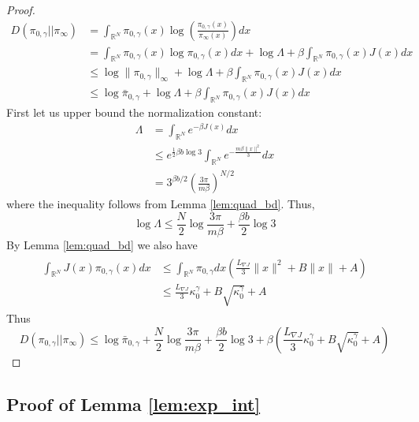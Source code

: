 \documentclass[journal,onecolumn]{IEEEtran}
\newcommand{\grad}{\nabla}
\newcommand{\rew}{J}
\newcommand{\reals}{\mathbb{R}}
\newcommand{\dimn}{N}
\newcommand{\kn}{\kappa_0}
\newcommand{\knw}{\kn^{\idw}}
\newcommand{\KL}{D}
\newcommand{\gibbs}{\ids_{\infty}}
\newcommand{\ids}{\pi}
\newcommand{\idw}{\gamma}
\newcommand{\isp}{0,\idw}
\newcommand{\idistmaxw}{\bar{\ids}_{\isp}}
\newcommand{\constA}{A}
\newcommand{\constB}{B}
\newcommand{\dissm}{m}
\newcommand{\dissb}{b}
\newcommand{\idistrw}{\ids_{\isp}}
\newcommand{\lipGJ}{L_{\grad\rew}}
\begin{document}
{\begin{proof}
\begin{align*}
\KL(\idistrw || \gibbs) &= \int_{\reals^{\dimn}}\idistrw(x) \log\left( \frac{\idistrw(x)}{\gibbs(x)}\right)dx \\
& = \int_{\reals^{\dimn}}\idistrw(x)\log\idistrw(x)dx + \log\Lambda + \beta\int_{\reals^{\dimn}}\idistrw(x)\rew(x) dx \\
& \leq \log\|\idistrw\|_{\infty} + \log\Lambda + \beta\int_{\reals^{\dimn}}\idistrw(x)\rew(x) dx \\
& \leq \log\idistmaxw + \log\Lambda + \beta\int_{\reals^{\dimn}}\idistrw(x)\rew(x) dx
\end{align*}
First let us upper bound the normalization constant:
\begin{align*}
\Lambda &= \int_{\reals^{\dimn}}e^{-\beta \rew(x)}dx \\
&\leq e^{\frac{1}{2}\beta \dissb\log3}\int_{\reals^{\dimn}}e^{-\frac{\dissm\beta\|x\|^2}{3}} dx \\
& = 3^{\beta \dissb / 2}\left(\frac{3\pi}{\dissm\beta} \right)^{\dimn/2}
\end{align*}
where the inequality follows from Lemma \ref{lem:quad_bd}. Thus,
\[\log \Lambda \leq \frac{\dimn}{2} \log\frac{3\pi}{\dissm\beta} + \frac{\beta \dissb}{2}\log3\]
By Lemma \ref{lem:quad_bd} we also have 
\begin{align*}
\begin{split}
    \int_{\reals^{\dimn}}\rew(x)\idistrw(x)dx &\leq \int_{\reals^{\dimn}}\idistrw{dx}\left(\frac{\lipGJ}{3}\|x\|^2 + \constB\|x\| + \constA \right) \\
    & \leq \frac{\lipGJ}{3}\knw + \constB\sqrt{\knw} + \constA
\end{split}
\end{align*}
Thus
\[\KL(\idistrw || \gibbs) \leq \log\idistmaxw + \frac{\dimn}{2} \log\frac{3\pi}{\dissm\beta} + \frac{\beta \dissb}{2}\log3 + \beta\left(\frac{\lipGJ}{3}\knw + \constB\sqrt{\knw} + \constA\right) \]

\end{proof}  


\subsection*{Proof of Lemma \ref{lem:exp_int}}
    
}
\end{document}
